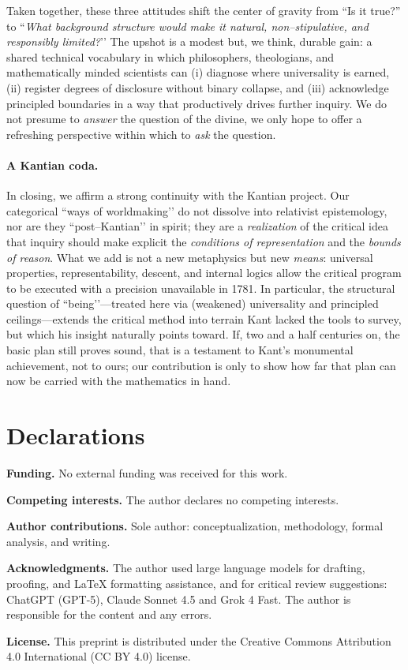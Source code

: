 \documentclass[11pt]{article}
\theoremstyle{upright}
\begin{document}
\medskip
Taken together, these three attitudes shift the center of gravity from “Is it true?” to “\emph{What background structure would make it natural, non–stipulative, and responsibly limited?}’’ The upshot is a modest but, we think, durable gain: a shared technical vocabulary in which philosophers, theologians, and mathematically minded scientists can (i) diagnose where universality is earned, (ii) register degrees of disclosure without binary collapse, and (iii) acknowledge principled boundaries in a way that productively drives further inquiry. We do not 
presume to \emph{answer} the question of the divine, we only hope to offer a refreshing perspective within which to \emph{ask} the question.

\paragraph{A Kantian coda.}
In closing, we affirm a strong continuity with the Kantian project. Our categorical “ways of worldmaking’’ do not dissolve into relativist epistemology, nor are they “post–Kantian’’ in spirit; they are a \emph{realization} of the critical idea that inquiry should make explicit the \emph{conditions of representation} and the \emph{bounds of reason}. What we add is not a new metaphysics but new \emph{means}: universal properties, representability, descent, and internal logics allow the critical program to be executed with a precision unavailable in 1781. In particular, the structural question of “being’’—treated here via (weakened) universality and principled ceilings—extends the critical method into terrain Kant lacked the tools to survey, but which his insight naturally points toward. If, two and a half centuries on, the basic plan still proves sound, that is a testament to Kant’s monumental achievement, not to ours; our contribution is only to show how far that plan can now be carried with the mathematics in hand.

\section*{Declarations}

\noindent\textbf{Funding.}
No external funding was received for this work.

\medskip
\noindent\textbf{Competing interests.}
The author declares no competing interests.

\medskip
\noindent\textbf{Author contributions.}
Sole author: conceptualization, methodology, formal analysis, and writing.

\medskip
\noindent\textbf{Acknowledgments.}
The author used large language models for drafting, proofing, and \LaTeX{} formatting assistance, and for critical review suggestions: ChatGPT (GPT-5), Claude Sonnet 4.5 and Grok 4 Fast. The author is responsible for the content and any errors.

\medskip
\noindent\textbf{License.}
This preprint is distributed under the Creative Commons Attribution 4.0 International (CC BY 4.0) license.



\end{document}
